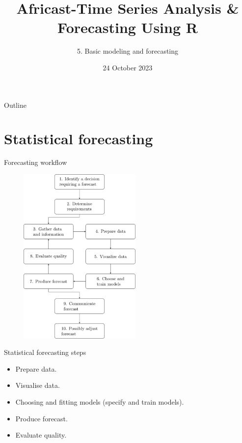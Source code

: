 \documentclass[
  14pt,
  ignorenonframetext,
  aspectratio=169,
]{beamer}
\title{Africast-Time Series Analysis \& Forecasting Using R}
\subtitle{5. Basic modeling and forecasting}
\author{}
\date{24 October 2023}
\providecommand{\tightlist}{%
  \setlength{\itemsep}{0pt}\setlength{\parskip}{0pt}}\usepackage{longtable,booktabs,array}
\begin{document}
\frame{\titlepage}
\begin{frame}{Outline}
\protect\hypertarget{outline}{}
\vspace*{0.7cm}\tableofcontents
\end{frame}

\hypertarget{statistical-forecasting}{%
\section{Statistical forecasting}\label{statistical-forecasting}}

\begin{frame}{Forecasting workflow}
\protect\hypertarget{forecasting-workflow}{}
\begin{figure}

{\centering \includegraphics[width=2.37in,height=\textheight]{figs/forecasting_workflow.png}

}

\end{figure}
\end{frame}

\begin{frame}{Statistical forecasting steps}
\protect\hypertarget{statistical-forecasting-steps}{}
\begin{itemize}
\tightlist
\item
  Prepare data.
\item
  Visualise data.
\item
  Choosing and fitting models (specify and train models).
\item
  Produce forecast.
\item
  Evaluate quality.
\end{itemize}
\end{frame}
\end{document}
